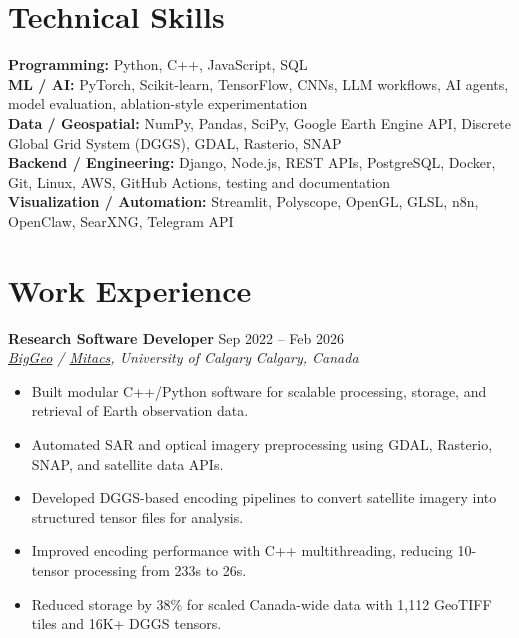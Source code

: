 \documentclass[a4paper,10pt]{article}
\newcommand{\resumeSubheading}[4]{
    \textbf{#1} \hfill #2 \\
    \textit{#3} \hfill \textit{#4}
}
\begin{document}
\section*{Technical Skills}

\textbf{Programming:} Python, C++, JavaScript, SQL \\
\textbf{ML / AI:} PyTorch, Scikit-learn, TensorFlow, CNNs, LLM workflows, AI agents, model evaluation, ablation-style experimentation \\
\textbf{Data / Geospatial:} NumPy, Pandas, SciPy, Google Earth Engine API, Discrete Global Grid System (DGGS), GDAL, Rasterio, SNAP \\
\textbf{Backend / Engineering:} Django, Node.js, REST APIs, PostgreSQL, Docker, Git, Linux, AWS, GitHub Actions, testing and documentation \\
\textbf{Visualization / Automation:} Streamlit, Polyscope, OpenGL, GLSL, n8n, OpenClaw, SearXNG, Telegram API


\section*{Work Experience}

\resumeSubheading
{Research Software Developer}
{Sep 2022 -- Feb 2026}
{\href{https://biggeo.com}{BigGeo} / \href{https://www.mitacs.ca/}{Mitacs}, University of Calgary}
{Calgary, Canada}
\begin{itemize}[leftmargin=0.25in]
    \item Built modular C++/Python software for scalable processing, storage, and retrieval of Earth observation data.
    \item Automated SAR and optical imagery preprocessing using GDAL, Rasterio, SNAP, and satellite data APIs.
    \item Developed DGGS-based encoding pipelines to convert satellite imagery into structured tensor files for analysis.
    \item Improved encoding performance with C++ multithreading, reducing 10-tensor processing from 233s to 26s.
    \item Reduced storage by 38\% for scaled Canada-wide data with 1,112 GeoTIFF tiles and 16K+ DGGS tensors.
\end{itemize}
\end{document}
